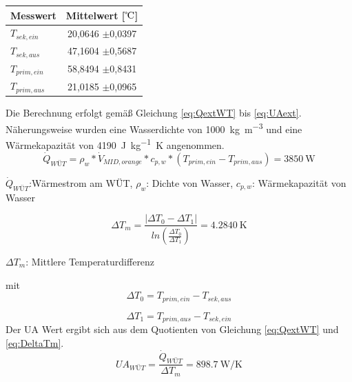 \begin{center}
	\begin{tabular}{l|c}
		\label{tab:extWT}
		
		\textbf{Messwert} & \textbf{Mittelwert} [${\celsius}$] \\
		\hline
	$T_{sek,ein}$ & 20,0646 $\pm$0,0397\\
	$T_{sek,aus}$ & 47,1604 $\pm$0,5687\\
	$T_{prim,ein}$ & 58,8494 $\pm$0,8431\\
	$T_{prim,aus}$ & 21,0185 $\pm$0,0965\\
	
	\end{tabular}
\end{center}
Die Berechnung erfolgt gemäß Gleichung \ref{eq:QextWT} bis \ref{eq:UAext}. Näherungsweise wurden eine Wasserdichte von \SI{1000}{\kilogram\per\cubic\meter} und eine Wärmekapazität von \SI{4190}{\joule\per\kilogram\kelvin} angenommen.
\begin{equation}
	\label{eq:QextWT}
	\dot Q_{WÜT} = \rho_{w} * \dot V_{MID,orange} * c_{p,w} * (T_{prim,ein}-T_{prim,aus}) = \SI{3850}{\watt}
\end{equation}

\begin{center}
	\begin{small}
	$\dot Q_{WÜT}$:Wärmestrom am WÜT,	
	$\rho_{w}$:	Dichte von Wasser,
	$c_{p,w}$: Wärmekapazität von Wasser
	\end{small}
\end{center}

\begin{equation}
	\label{eq:DeltaTm}
	\Delta T_{m} = \frac{|\Delta T_{0} - \Delta T_{1}|}{ln(\frac{\Delta T_{0}}{\Delta T_{1}})} = \SI{4,2840}{\kelvin}
\end{equation}
\begin{center}
	\begin{small}
		$\Delta T_{m}$: Mittlere Temperaturdifferenz
	\end{small}
\end{center}

mit
\begin{equation}
	\label{eq:DeltaT0}
	\Delta T_{0} = T_{prim,ein} - T_{sek,aus}
\end{equation}

\begin{equation}
	\label{eq:DeltaT1}
	\Delta T_{1} = T_{prim,aus} - T_{sek,ein}
\end{equation}
Der UA Wert ergibt sich aus dem Quotienten von Gleichung \ref{eq:QextWT} und \ref{eq:DeltaTm}.
\begin{equation}
	\label{eq:UAext}
	UA_{WÜT} = \frac{\dot Q_{WÜT}}{\Delta T_{m}} = \SI{898,7}{\watt\per\kelvin}
\end{equation}

